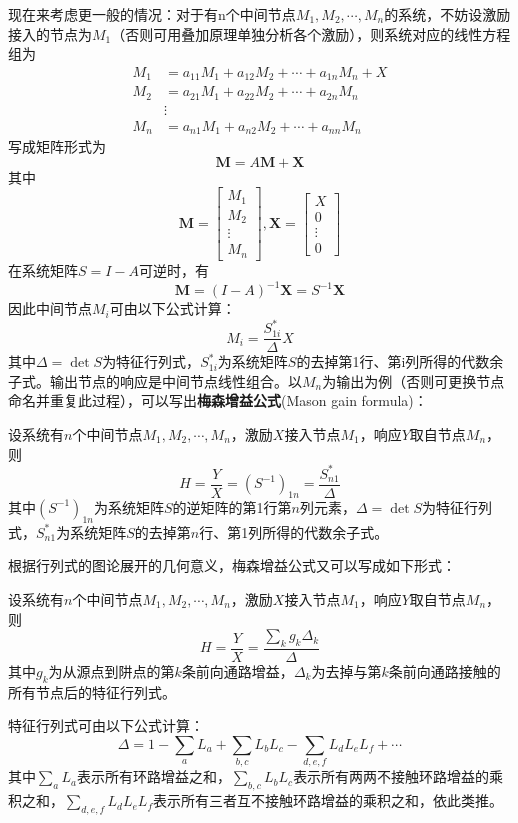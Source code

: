 \documentclass{ctexbook}
\begin{document}
现在来考虑更一般的情况：对于有n个中间节点$M_1,M_2,\cdots,M_n$的系统，不妨设激励接入的节点为$M_1$（否则可用叠加原理单独分析各个激励），则系统对应的线性方程组为\begin{align*}
    M_1&=a_{11} M_1 + a_{12} M_2 + \cdots + a_{1n} M_n + X\\
    M_2&=a_{21} M_1 + a_{22} M_2 + \cdots + a_{2n} M_n\\
    &\vdots\\
    M_n&=a_{n1} M_1 + a_{n2} M_2 + \cdots + a_{nn} M_n
\end{align*}
写成矩阵形式为
\[\mathbf{M}=A\mathbf{M}+\mathbf{X}\]
其中$$\mathbf{M}=\begin{bmatrix}
    M_1 \\
    M_2 \\
    \vdots \\
    M_n
\end{bmatrix},\mathbf{X}=\begin{bmatrix}
    X \\
    0 \\
    \vdots \\
    0
\end{bmatrix}$$
在系统矩阵$S=I-A$可逆时，有
\[\mathbf{M}=(I-A)^{-1}\mathbf{X}=S^{-1}\mathbf{X}\]
因此中间节点$M_i$可由以下公式计算：\[M_i=\frac{S^*_{1i}}{\Delta} X\]
其中$\Delta=\det S$为特征行列式，$S^*_{1i}$为系统矩阵$S$的去掉第1行、第i列所得的代数余子式。输出节点的响应是中间节点线性组合。以$M_n$为输出为例（否则可更换节点命名并重复此过程），可以写出\textbf{梅森增益公式}(Mason gain formula)：
\begin{theorem}[梅森增益公式]
    设系统有$n$个中间节点$M_1,M_2,\cdots,M_n$，激励$X$接入节点$M_1$，响应$Y$取自节点$M_n$，则
    \[H=\frac{Y}{X}=(S^{-1})_{1n}=\frac{S^*_{n1}}{\Delta}\]
    其中$(S^{-1})_{1n}$为系统矩阵$S$的逆矩阵的第1行第$n$列元素，$\Delta=\det S$为特征行列式，$S^*_{n1}$为系统矩阵$S$的去掉第$n$行、第1列所得的代数余子式。
\end{theorem}

根据行列式的图论展开的几何意义，梅森增益公式又可以写成如下形式：
\begin{theorem}
    设系统有$n$个中间节点$M_1,M_2,\cdots,M_n$，激励$X$接入节点$M_1$，响应$Y$取自节点$M_n$，则
    \[H=\frac{Y}{X}=\frac{\sum_{k}g_k\Delta_k}{\Delta}\]
    其中$g_k$为从源点到阱点的第$k$条前向通路增益，$\Delta_k$为去掉与第$k$条前向通路接触的所有节点后的特征行列式。

    特征行列式可由以下公式计算：
    $$\Delta=1-\sum_a L_a+\sum_{b,c}L_b L_c-\sum_{d,e,f}L_d L_e L_f+\cdots$$
    其中$\sum_a L_a$表示所有环路增益之和，$\sum_{b,c}L_b L_c$表示所有两两不接触环路增益的乘积之和，$\sum_{d,e,f}L_d L_e L_f$表示所有三者互不接触环路增益的乘积之和，依此类推。
\end{theorem}
\end{document}
